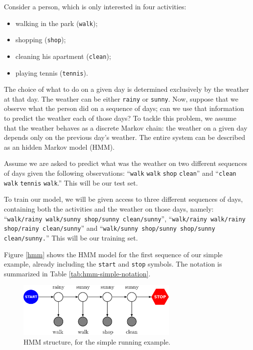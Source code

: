 \begin{example}

Consider a person, which is only interested in four activities: 
\begin{itemize}
\item walking in
the park ({\tt walk});
\item shopping ({\tt shop});
\item cleaning his apartment ({\tt clean});
\item playing tennis ({\tt tennis}).
\end{itemize}
The choice of what to do on a given day is determined exclusively by the weather at that day. The
weather can be either {\tt rainy} or {\tt sunny}. 
Now, suppose that we observe what the person did on a sequence of days; 
can we use that information to predict the weather each of those days? 
To tackle this problem, we assume 
that the weather behaves as a discrete Markov chain: the weather on a
given day depends only on 
the previous day's  weather. 
The entire system can be described as an hidden Markov model (HMM).

Assume we are asked to predict what was the weather on two different
sequences of days given the following observations: ``{\tt walk} {\tt walk} {\tt shop}
{\tt clean}''  and 
``{\tt clean} {\tt walk} {\tt tennis}
{\tt walk}.''
This will be our test set.

To train our model, we will be given access to three different sequences of
days, containing both the activities and the weather on those days, namely: 
``{\tt walk/rainy walk/sunny shop/sunny
clean/sunny}'', ``{\tt walk/rainy walk/rainy shop/rainy clean/sunny}'' and ``{\tt walk/sunny shop/sunny shop/sunny clean/sunny.}'' This
will be our training set.


Figure \ref{hmm} shows the HMM model for the first sequence of our simple
example, already including the {\tt start} and 
{\tt stop} symbols. The notation is summarized in Table \ref{tab:hmm-simple-notation}.
\end{example}
 



\begin{figure}[ht]
\centering
\includegraphics[width=0.7\textwidth]{figs/sequences/hmm_new}
\caption[HMM running example]{\label{fig:hmm}HMM structure, for the simple
running example.}
\end{figure}

